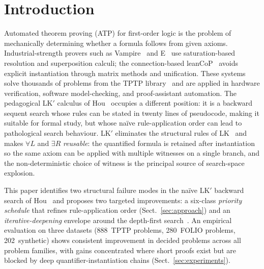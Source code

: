 \section{Introduction}

Automated theorem proving (ATP) for first-order logic is the problem of
mechanically determining whether a formula follows from given axioms.
Industrial-strength provers such as Vampire~\cite{kovacs2013vampire} and
E~\cite{schulz2002E} use saturation-based resolution and superposition
calculi; the connection-based leanCoP~\cite{otten2003leancop} avoids
explicit instantiation through matrix methods and unification. These
systems solve thousands of problems from the TPTP
library~\cite{Sut17} and are applied in hardware verification, software
model-checking, and proof-assistant automation. The pedagogical LK$'$
calculus of Hou~\cite[Fig.~2.3, p.~65]{hou2021fundamentals} occupies a
different position: it is a backward sequent search whose rules
can be stated in twenty lines of pseudocode, making it suitable for formal
study, but whose na\"ive rule-application order can lead to pathological
search behaviour. LK$'$ eliminates the structural rules of
LK~\cite{gentzen1935untersuchungen} and makes $\forall L$ and $\exists R$
\emph{reusable}: the quantified formula is retained after
instantiation so the same axiom can be applied with multiple witnesses on a
single branch, and the non-deterministic choice of witness is the principal
source of search-space explosion.

This paper identifies two structural failure modes in the na\"ive LK$'$
backward search of Hou~\cite[Algorithm~2, p.~67]{hou2021fundamentals} and
proposes two targeted improvements: a six-class \emph{priority schedule}
that refines rule-application order (Sect.~\ref{sec:approach}) and an
\emph{iterative-deepening} envelope around the depth-first
search~\cite{korf1985iterative}. An empirical evaluation on three datasets
(888~TPTP problems, 280~FOLIO problems, 202~synthetic) shows consistent
improvement in decided problems across all problem families, with gains
concentrated where short proofs exist but are blocked by deep
quantifier-instantiation chains (Sect.~\ref{sec:experiments}).
